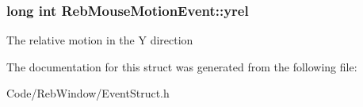 \subsubsection[{\texorpdfstring{yrel}{yrel}}]{\setlength{\rightskip}{0pt plus 5cm}long int Reb\+Mouse\+Motion\+Event\+::yrel}\hypertarget{struct_reb_mouse_motion_event_a9609f16fdc4e801bc3d0d7e6c5fa9843}{}\label{struct_reb_mouse_motion_event_a9609f16fdc4e801bc3d0d7e6c5fa9843}
The relative motion in the Y direction 

The documentation for this struct was generated from the following file\+:\begin{DoxyCompactItemize}
\item 
Code/\+Reb\+Window/Event\+Struct.\+h\end{DoxyCompactItemize}
